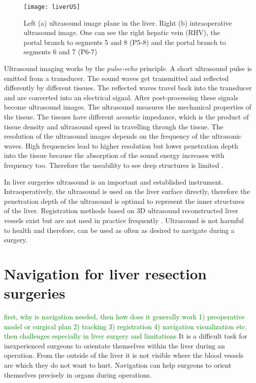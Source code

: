\begin{figure}[H]
  \centering
 \texttt{[image: liverUS]}
 \caption{ Left (a) ultrasound image plane in the liver. Right (b) intraoperative
   ultrasound image. One can see the right hepatic vein (RHV), the portal branch
   to segments 5 and 8 (P5-8) and the portal branch to segments 6 and 7 (P6-7) \cite{torzilli2014ultrasound}}
  \label{fig:liverUS}
\end{figure}

Ultrasound imaging works by the \textit{pulse-echo} principle. A short
ultrasound pulse is emitted from a transducer. The sound waves get
transmitted and reflected differently by different tissues. The reflected
 waves travel back into the transducer and are converted into an electrical
signal. After post-processing these signals become ultrasound images. 
The ultrasound measures the mechanical properties of the tissue. The tissues
have different acoustic impedance, which is the product of tissue density and
ultrasound speed in travelling through the tissue. The resolution of the
ultrasound images depends on the frequency of the ultrasonic waves. High
frequencies lead to higher resolution but lower penetration depth into the tissue because the
absorption of the sound energy increases with frequency too. Therefore the
useability to see deep structures is limited \cite{torzilli2014ultrasound}. 

In liver surgeries ultrasound is an important and established instrument.
Intraoperatively, the ultrasound is used on the liver surface directly,
therefore the penetration depth of the
ultrasound is optimal to represent the inner structures of the liver.
Registration methods based on 3D ultrasound reconstructed liver vessels 
exist but are not used in practice frequently \cite{lange2003vessel}. Ultrasound
is not harmful to health and therefore, can
be used as often as desired to navigate during a surgery.

\section{Navigation for liver resection surgeries}
\label{sec:navigationForLiverResections}
\textcolor{green}{first, why is navigation needed, then how does it generally work
  1) preoperative model or surgical plan 2) tracking 3) registration 4)
  navigation visualization etc. then challenges especially in liver surgery and limitations}
It is a difficult task for inexperienced surgeons to orientate themselves within the liver during an operation.
From the outside of the liver it is not visible where the blood vessels are which they do not want to hurt.
Navigation can help surgeons to orient themselves precisely in organs during
operations.

